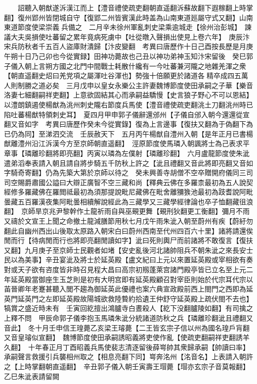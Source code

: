 　　詔聽入朝猷遂泝漢江而上【澧音禮使疏吏翻朝直遥翻泝蘇故翻下遐稼翻上時掌翻】復州郢州皆閉城自守【復郢二州皆賓漢此時盖為山南東道廵屬守式又翻】山南東道節度使梁崇義兵備之　二月辛未徐州軍亂刺史梁乘逾城走【徐州治彭城】　諫議大夫吳損使吐蕃留之累年竟病死虜中【吐從暾入聲損出使見上卷六年】　庚辰汴宋兵防秋者千五百人盜庫財潰歸【汴皮變翻　考異曰唐歷作十日己酉按長歷是月庚午朔十日乃己卯也今從實録】田神功薨故也己丑以神功弟神玉知汴宋留後　癸巳郭子儀入朝上言朔方國之北門中間戰士耗散什纔有一今吐蕃兼河隴之地雜羌渾之衆【朝直遥翻史炤曰羌党項之屬渾吐谷渾也】勢強十倍願更於諸道各精卒成四五萬人則制勝之道必矣　三月戊申以皇女永樂公主許妻魏博節度使田承嗣之子華【樂音洛妻七細翻嗣祥吏翻】上意欲固結其心而承嗣益驕慢【史言狼子野心不可以恩結】　以澧朗鎮遏使楊猷為洮州刺史隴右節度兵馬使【澧音禮使疏吏翻洮土刀翻洮州時已陷吐蕃楊猷特領刺史耳】　夏四月甲申郭子儀辭還邠州【子儀自邠入朝今還還從宣翻又音如字　考異曰唐歷作癸未今從實錄】復為上言邊事【復扶又翻為于偽翻下為已仍為同】至涕泗交流　壬辰赦天下　五月丙午楊猷自澧州入朝【是年正月已書楊猷離澧州沿江泝漢今方至京師朝直遥翻】　涇原節度使馬璘入朝諷將士為己表求平章事【璘離珍翻將即亮翻】丙寅以璘為左僕射【璘離珍翻】　六月盧龍節度使朱泚遣弟滔奉表請入朝且請自將步騎五千防秋上許之【泚且禮翻又音此將即亮翻又音如字騎奇寄翻】仍為先築大第於京師以待之　癸未興善寺胡僧不空卒贈開府儀同三司司空賜爵肅國公謚曰大辯正廣智不空三藏和尚【釋典云佛在多羅柰最初為五人說契經修多羅藏佛在羅閲祗最初為須那提說毗尼藏佛在毗舍離獼㺅池最初為跂耆說阿毗曇藏五百羅漢夜集阿毗曇相續解說經此為三藏學又三藏學經律論也卒子恤翻藏徂浪翻】　京師旱京兆尹黎幹作土龍祈雨自與巫覡更舞【覡刑狄翻更工衡翻】彌月不雨又禱於文宣王上聞之命撤土龍減膳節用秋七月戊午雨朱泚入朝至蔚州有疾【蔚紆勿翻此自幽州西出山後取太原路入朝宋白曰蔚州西南至代州四百六十里】諸將請還俟閒而行【待病閒而行也將即亮翻閒讀如字】泚曰死則輿尸而前諸將不敢復言【復扶又翻】九月庚子至京師士民觀者如堵【安史亂後河北諸帥阻兵不朝朱泚之來長安士民以為美事】辛丑宴泚及將士於延英殿【盧文紀曰上元以來置延英殿或宰相欲有奏對或天子欲有咨度皆非時召見程大昌曰高宗初剏蓬萊宫諸門殿亭皆已立名至上元二年延英殿當御座生玉芝則是初有大明宫即有延英殿顧召對宰臣則始於代宗耳代宗以苖晉卿年老蹇甚聽入閭不趨為御延英此優禮也案六典宣政殿前西上閤門之西即為延英門延英門之左即延英殿故陽城欲救陸䞇約拾遺王仲舒守延英殿上疏伏閤不去也】犒賞之盛近時未有　壬寅回紇擅出鴻臚寺白晝殺人【紇下没翻臚陵如翻】有司擒之上釋不問　甲辰命郭子儀李抱玉馬璘朱泚分統諸道防秋之兵【璘離珍翻泚且禮翻又音此】　冬十月壬申信王瑝薨乙亥梁王璿薨【二王皆玄宗子信以州為國名瑝戶肓翻又音皇璿似宣翻】　魏博節度使田承嗣誘昭義將吏使作亂【使疏吏翻嗣祥吏翻誘羊久翻】　十年春正月丁酉昭義兵馬使裴志清逐留後薛㟧帥其衆歸承嗣【帥讀曰率】承嗣聲言救援引兵襲相州取之【相息亮翻下同】㟧奔洺州【洺音名】上表請入朝許之【上時掌翻朝直遥翻】　辛丑郭子儀入朝壬寅壽王瑁薨【瑁亦玄宗子音莫報翻】　乙巳朱泚表請留闕


